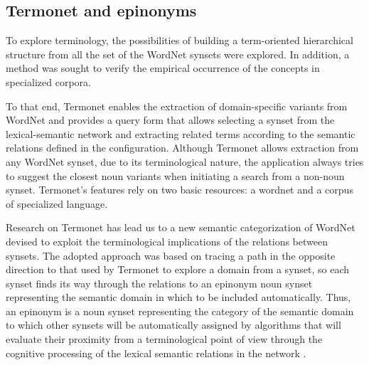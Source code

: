 \documentclass[runningheads]{llncs}
\begin{document}
\subsection{Termonet and epinonyms}

To explore terminology,   the possibilities of building a term-oriented hierarchical structure from all the set of the WordNet synsets were explored. In addition, a method was sought to verify the empirical occurrence of the concepts in specialized corpora.

To that end,  Termonet  enables the extraction of domain-specific variants from WordNet and provides a query form that allows selecting a synset from the lexical-semantic network and extracting related terms according to the semantic relations defined in the configuration. Although Termonet allows extraction from any WordNet synset, due to its terminological nature, the application always tries to suggest the closest noun variants when initiating a search from a non-noun synset.  Termonet's features rely on two basic resources: a wordnet and a corpus of specialized language. 

Research on Termonet has lead us to a new semantic categorization of WordNet devised to exploit the terminological implications of the relations between synsets. The adopted approach was based on tracing a path in the opposite direction to that used by Termonet to explore a domain from a synset, so each synset finds its way through the relations to an epinonym noun synset representing the semantic domain in which to be included automatically. Thus, an epinonym is a noun synset representing the category of the semantic domain to which other synsets will be automatically assigned by algorithms that will evaluate their proximity from a terminological point of view through the cognitive processing of the lexical semantic relations in the network \cite{galnet}.



\end{document}

